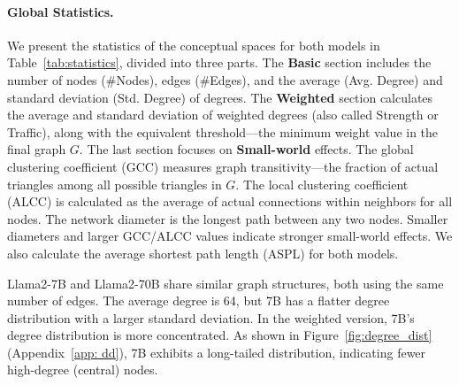 \paragraph{Global Statistics.}
We present the statistics of the conceptual spaces for both models in Table~\ref{tab:statistics}, divided into three parts. The \textbf{Basic} section includes the number of nodes (\#Nodes), edges (\#Edges), and the average (Avg. Degree) and standard deviation (Std. Degree) of degrees. The \textbf{Weighted} section calculates the average and standard deviation of weighted degrees (also called Strength or Traffic), along with the equivalent threshold—the minimum weight value in the final graph $G$. The last section focuses on \textbf{Small-world} effects. The global clustering coefficient (GCC) measures graph transitivity—the fraction of actual triangles among all possible triangles in $G$. The local clustering coefficient (ALCC) is calculated as the average of actual connections within neighbors for all nodes. The network diameter is the longest path between any two nodes. Smaller diameters and larger GCC/ALCC values indicate stronger small-world effects. We also calculate the average shortest path length (ASPL) for both models.





Llama2-7B and Llama2-70B share similar graph structures, both using the same number of edges. The average degree is 64, but 7B has a flatter degree distribution with a larger standard deviation. In the weighted version, 7B's degree distribution is more concentrated. As shown in Figure~\ref{fig:degree_dist} (Appendix~\ref{app: dd}), 7B exhibits a long-tailed distribution, indicating fewer high-degree (central) nodes.  

